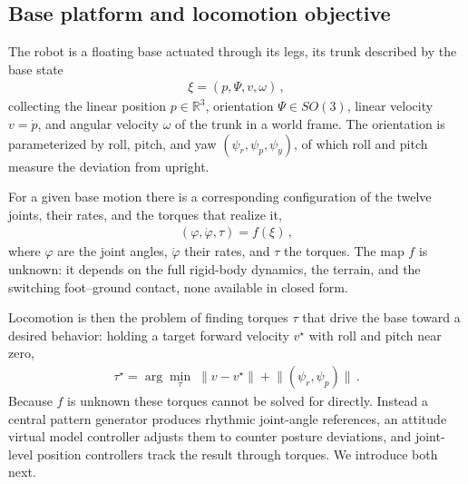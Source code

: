 \documentclass[letterpaper, 10 pt, conference]{ieeeconf}  %
\begin{document}
\subsection{Base platform and locomotion objective}
\label{sec:base-platform}

%

The robot is a floating base actuated through its legs, its trunk described by the base state
\begin{align}
  \xi = (p, \Psi, v, \omega) \,,
  \label{eq:base-state}
\end{align}
collecting the linear position $p \in \mathbb{R}^3$, orientation $\Psi \in SO(3)$, linear velocity $v = \dot{p}$, and angular velocity $\omega$ of the trunk in a world frame.
The orientation is parameterized by roll, pitch, and yaw $(\psi_r, \psi_p, \psi_y)$, of which roll and pitch measure the deviation from upright.

For a given base motion there is a corresponding configuration of the twelve joints, their rates, and the torques that realize it,
\begin{align}
  (\varphi, \dot{\varphi}, \tau) = f(\xi) \,,
  \label{eq:base-to-joints}
\end{align}
where $\varphi$ are the joint angles, $\dot{\varphi}$ their rates, and $\tau$ the torques.
The map $f$ is unknown: it depends on the full rigid-body dynamics, the terrain, and the switching foot--ground contact, none available in closed form.

Locomotion is then the problem of finding torques $\tau$ that drive the base toward a desired behavior: holding a target forward velocity $v^\star$ with roll and pitch near zero,
\begin{align}
  \tau^\star = \arg\min_{\tau} \; \big\lVert v - v^\star \big\rVert + \big\lVert (\psi_r, \psi_p) \big\rVert \,.
  \label{eq:locomotion-objective}
\end{align}
Because $f$ is unknown these torques cannot be solved for directly.
Instead a central pattern generator produces rhythmic joint-angle references, an attitude virtual model controller adjusts them to counter posture deviations, and joint-level position controllers track the result through torques.
We introduce both next.
\end{document}
